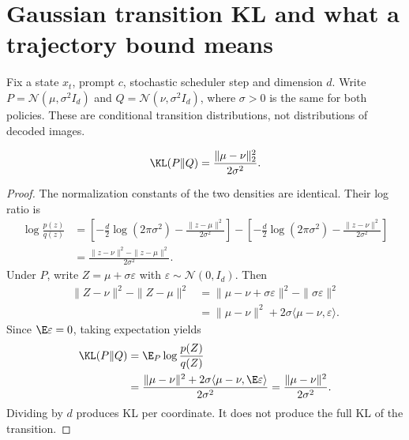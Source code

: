 \section{Gaussian transition KL and what a trajectory bound means}
\label{app:gaussian_proofs}
Fix a state $x_t$, prompt $c$, stochastic scheduler step and dimension $d$. Write $P=\mathcal N(\mu,\sigma^2I_d)$ and $Q=\mathcal N(\nu,\sigma^2I_d)$, where $\sigma>0$ is the same for both policies. These are conditional transition distributions, not distributions of decoded images.

\begin{proposition}
\begin{equation}
\KL(P\Vert Q)=\frac{\|\mu-\nu\|_2^2}{2\sigma^2}.
\end{equation}
\end{proposition}
\begin{proof}
The normalization constants of the two densities are identical. Their log ratio is
\begin{align}
\log\frac{p(z)}{q(z)}
&=\left[-\frac d2\log(2\pi\sigma^2)-\frac{\|z-\mu\|^2}{2\sigma^2}\right]
 -\left[-\frac d2\log(2\pi\sigma^2)-\frac{\|z-\nu\|^2}{2\sigma^2}\right]\\
&=\frac{\|z-\nu\|^2-\|z-\mu\|^2}{2\sigma^2}.
\end{align}
Under $P$, write $Z=\mu+\sigma\varepsilon$ with $\varepsilon\sim\mathcal N(0,I_d)$. Then
\begin{align}
\|Z-\nu\|^2-\|Z-\mu\|^2
&=\|\mu-\nu+\sigma\varepsilon\|^2-\|\sigma\varepsilon\|^2\\
&=\|\mu-\nu\|^2+2\sigma\langle\mu-\nu,\varepsilon\rangle.
\end{align}
Since $\E\varepsilon=0$, taking expectation yields
\begin{align}
\KL(P\Vert Q)
&=\E_P\log\frac{p(Z)}{q(Z)}\\
&=\frac{\|\mu-\nu\|^2+2\sigma\langle\mu-\nu,\E\varepsilon\rangle}{2\sigma^2}
 =\frac{\|\mu-\nu\|^2}{2\sigma^2}.
\end{align}
Dividing by $d$ produces KL per coordinate. It does not produce the full KL of the transition.
\end{proof}

